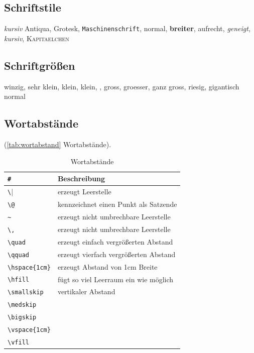 \subsection{Schriftstile}\label{sec:schriftstile}

\emph{kursiv}
\textrm{Antiqua}, \textsf{Grotesk}, \texttt{Maschinenschrift},
\textmd{normal}, \textbf{breiter}, \textup{aufrecht}, \textsl{geneigt},
\textit{kursiv}, \textsc{Kapitaelchen}

\subsection{Schriftgrößen}

\tiny{winzig}, \scriptsize{sehr klein}, \footnotesize{klein},
\small{klein}, , \large{gross}, \Large{groesser},
\LARGE{ganz gross}, \huge{riesig}, \Huge{gigantisch} \normalsize{normal}

\subsection{Wortabstände}\label{sec:Wortabstaende}

(\autoref{tab:wortabstand} Wortabstände).
\begin{table}[!hb] %
	\centering
	\begin{tabular} {ll}
	\toprule %
	\verb|#| & \textbf{Beschreibung} \\
	\midrule
			\verb|\| & erzeugt Leerstelle \\
			\verb|\@| & kennzeichnet einen Punkt als Satzende \\
			\verb|~| & erzeugt nicht umbrechbare Leerstelle \\
			\verb|\,| & erzeugt nicht umbrechbare Leerstelle \\
			\verb|\quad| & erzeugt einfach vergrößerten Abstand \\
			\verb|\qquad| & erzeugt vierfach vergrößerten Abstand \\
			\verb|\hspace{1cm}| & erzeugt Abstand von 1cm Breite \\
			\verb|\hfill| & fügt so viel Leerraum ein wie möglich \\
			\verb|\smallskip| & vertikaler Abstand\\
			\verb|\medskip| & \\
			\verb|\bigskip| & \\
			\verb|\vspace{1cm}| & \\
			\verb|\vfill| & \\
	\bottomrule
	\end{tabular}
	\caption{Wortabstände }	%
	\label{tab:wortabstand}	%
\end{table}

